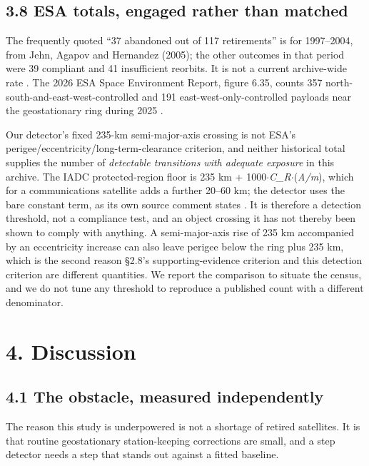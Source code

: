 \documentclass[11pt]{article}
\begin{document}
\subsection*{3.8 ESA totals, engaged rather than matched}

The frequently quoted ``37 abandoned out of 117 retirements'' is for 1997--2004, from Jehn, Agapov and Hernandez (2005); the other outcomes in that period were 39 compliant and 41 insufficient reorbits. It is not a current archive-wide rate%
. The 2026 ESA Space Environment Report, figure 6.35, counts 357 north-south-and-east-west-controlled and 191 east-west-only-controlled payloads near the geostationary ring during 2025%
.

Our detector's fixed 235-km semi-major-axis crossing is not ESA's perigee/eccentricity/long-term-clearance criterion, and neither historical total supplies the number of \emph{detectable transitions with adequate exposure} in this archive. The IADC protected-region floor is 235 km + 1000$\cdot$\emph{C\_R}$\cdot$(\emph{A/m}), which for a communications satellite adds a further 20--60 km; the detector uses the bare constant term, as its own source comment states%
. It is therefore a detection threshold, not a compliance test, and an object crossing it has not thereby been shown to comply with anything. A semi-major-axis rise of 235 km accompanied by an eccentricity increase can also leave perigee below the ring plus 235 km, which is the second reason \S{}2.8's supporting-evidence criterion and this detection criterion are different quantities. We report the comparison to situate the census, and we do not tune any threshold to reproduce a published count with a different denominator.

\section*{4. Discussion}

\subsection*{4.1 The obstacle, measured independently}

The reason this study is underpowered is not a shortage of retired satellites. It is that routine geostationary station-keeping corrections are small, and a step detector needs a step that stands out against a fitted baseline.
\end{document}

